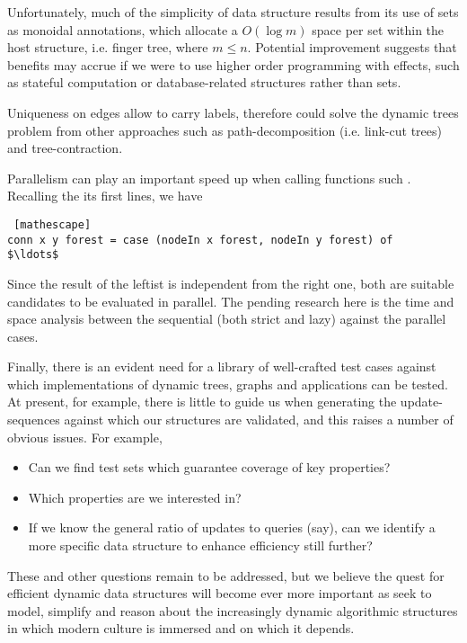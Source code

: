 Unfortunately, much of the simplicity of \dyntset data structure results from its use of sets as monoidal annotations, which allocate a $O(\log m)$ space per set within the host structure, i.e. finger tree, where $m \leq n$. Potential improvement suggests that benefits may accrue if we were to use higher order programming with effects, such as stateful computation or database-related structures rather than sets.

Uniqueness on edges allow to carry labels, therefore \dyntset could solve the dynamic trees problem from other approaches such as path-decomposition (i.e. link-cut trees) and tree-contraction. 

Parallelism can play an important speed up when calling functions such \conn. Recalling the its first lines, we have
\begin{lstlisting} [mathescape]
conn x y forest = case (nodeIn x forest, nodeIn y forest) of 
$\ldots$
\end{lstlisting}
Since the result of the leftist  is independent from the right one, both are suitable candidates to be evaluated in parallel. The pending research here is the time and space analysis between the sequential (both strict and lazy) against the parallel cases.

Finally, there is an evident need for a library of well-crafted test cases against which implementations of dynamic trees, graphs and applications can be tested. At present, for example, there is little to guide us when generating the update-sequences against which our structures are validated, and this raises a number of obvious issues. For example,

\begin{itemize}
\item Can we find test sets which guarantee coverage of key properties?
\item Which properties are we interested in?
\item If we know the general ratio of updates to queries (say), can we identify a more specific data structure to enhance efficiency still further?
\end{itemize}

These and other questions remain to be addressed, but we believe the quest for efficient dynamic data structures will become ever more important as seek to model, simplify and reason about the increasingly dynamic algorithmic structures in which modern culture is immersed and on which it depends.
